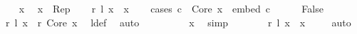 \begin{isabellebody}
\ \ \isamarkupfalse%
\ x\ \isamarkupfalse%
\ {\isachardoublequoteopen}x\ {\isasymin}\ Rep{\isachardoublequoteclose}\isanewline
\ \ \isamarkupfalse%
\ {\isachardoublequoteopen}r\ {\isacharparenleft}{\kern0pt}l\ x{\isacharparenright}{\kern0pt}\ {\isacharequal}{\kern0pt}\ x{\isachardoublequoteclose}\isanewline
\ \ \isamarkupfalse%
\ {\isacharparenleft}{\kern0pt}cases\ {\isachardoublequoteopen}{\isasymexists}c\ {\isasymin}\ Core{\isachardot}{\kern0pt}\ x\ {\isacharequal}{\kern0pt}\ embed\ c{\isachardoublequoteclose}{\isacharparenright}{\kern0pt}\isanewline
\ \ \ \ \isamarkupfalse%
\ False\isanewline
\ \ \ \ \isamarkupfalse%
\ \isamarkupfalse%
\ {\isachardoublequoteopen}r\ {\isacharparenleft}{\kern0pt}l\ x{\isacharparenright}{\kern0pt}\ {\isacharequal}{\kern0pt}\ r\ {\isasymlangle}Core{\isacharcomma}{\kern0pt}\ x{\isasymrangle}{\isachardoublequoteclose}\ \isamarkupfalse%
\ l{\isacharunderscore}{\kern0pt}def\ \isamarkupfalse%
\ auto\isanewline
\ \ \ \ \isamarkupfalse%
\ \isamarkupfalse%
\ {\isachardoublequoteopen}{\isachardot}{\kern0pt}{\isachardot}{\kern0pt}{\isachardot}{\kern0pt}\ {\isacharequal}{\kern0pt}\ x{\isachardoublequoteclose}\ \isamarkupfalse%
\ simp\isanewline
\ \ \ \ \isamarkupfalse%
\ \isamarkupfalse%
\ {\isachardoublequoteopen}r\ {\isacharparenleft}{\kern0pt}l\ x{\isacharparenright}{\kern0pt}\ {\isacharequal}{\kern0pt}\ x{\isachardoublequoteclose}\ \isacommand{{\isachardot}{\kern0pt}}\isamarkupfalse%
\isanewline
\ \ \isamarkupfalse%
\ auto\isanewline
{}\isamarkupfalse%
%
\endisatagproof
{\isafoldproof}%
%
\isadelimproof
\isanewline
%
\endisadelimproof
\isanewline
{}\isamarkupfalse%
\isanewline
\isanewline
%
\isadelimtheory
\isanewline
%
\endisadelimtheory
%
\isatagtheory
{}\isamarkupfalse%
%
\endisatagtheory
{\isafoldtheory}%
%
\isadelimtheory
%
\endisadelimtheory
%
\end{isabellebody}%
\endinput
